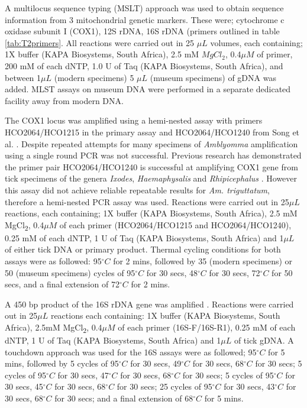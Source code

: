 \documentclass[a4paper, nobind]{templates/ociamthesis}
\begin{document}
A multilocus sequence typing (MSLT) approach was used to obtain sequence information from 3 mitochondrial genetic markers. These were; cytochrome c oxidase subunit I (COX1), 12S rDNA, 16S rDNA (primers outlined in table \ref{tab:T2primers}.
All reactions were carried out in 25 \(\mu L\) volumes, each containing; 1X buffer (KAPA Biosystems, South Africa), 2.5 mM \(MgCl_{2}\), 0.4\(\mu M\) of primer, 200 mM of each dNTP, 1.0 U of Taq (KAPA Biosystems, South Africa), and between 1\(\mu L\) (modern specimens) 5 \(\mu L\) (museum specimens) of gDNA was added. MLST assays on museum DNA were performed in a separate dedicated facility away from modern DNA.

The COX1 locus was amplified using a hemi-nested assay with primers HCO2064/HCO1215 in the primary assay and HCO2064/HCO1240 from Song et al. \autocite*{songPhylogeneticPhylogeographicRelationships2011}.
Despite repeated attempts for many specimens of \emph{Amblyomma} amplification using a single round PCR was not successful. Previous research has demonstrated the primer pair HCO2064/HCO1240 is successful at amplifying COX1 gene from tick specimens of the genera \emph{Ixodes}, \emph{Haemaphysalis} and \emph{Rhipicephalus} \autocite{evansAutomaticBarcodeGap2019}.
However this assay did not achieve reliable repeatable results for \emph{Am. triguttatum}, therefore a hemi-nested PCR assay was used.
Reactions were carried out in 25\(\mu L\) reactions, each containing; 1X buffer (KAPA Biosystems, South Africa), 2.5 mM MgCl\textsubscript{2}, 0.4\(\mu M\) of each primer (HCO2064/HCO1215 and HCO2064/HCO1240), 0.25 mM of each dNTP, 1 U of Taq (KAPA Biosystems, South Africa) and 1\(\mu L\) of either tick DNA or primary product. Thermal cycling conditions for both assays were as followed: 95\(^\circ C\) for 2 mins, followed by 35 (modern specimens) or 50 (museum specimens) cycles of 95\(^\circ C\) for 30 secs, 48\(^\circ C\) for 30 secs, 72\(^\circ C\) for 50 secs, and a final extension of 72\(^\circ C\) for 2 mins.

A 450 bp product of the 16S rDNA gene was amplified \autocite{lvDevelopmentDNABarcoding2014}. Reactions were carried out in 25\(\mu L\) reactions each containing: 1X buffer (KAPA Biosystems, South Africa), 2.5mM MgCl\textsubscript{2}, 0.4\(\mu M\) of each primer (16S-F/16S-R1), 0.25 mM of each dNTP, 1 U of Taq (KAPA Biosystems, South Africa) and 1\(\mu L\) of tick gDNA. A touchdown approach was used for the 16S assays were as followed; 95\(^\circ C\) for 5 mins, followed by 5 cycles of 95\(^\circ C\) for 30 secs, 49\(^\circ C\) for 30 secs, 68\(^\circ C\) for 30 secs; 5 cycles of 95\(^\circ C\) for 30 secs, 47\(^\circ C\) for 30 secs, 68\(^\circ C\) for 30 secs; 5 cycles of 95\(^\circ C\) for 30 secs, 45\(^\circ C\) for 30 secs, 68\(^\circ C\) for 30 secs; 25 cycles of 95\(^\circ C\) for 30 secs, 43\(^\circ C\) for 30 secs, 68\(^\circ C\) for 30 secs; and a final extension of 68\(^\circ C\) for 5 mins.
\end{document}
